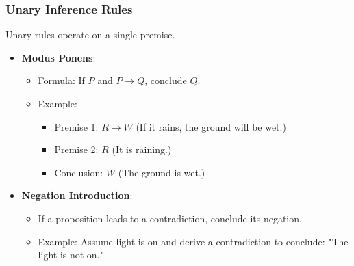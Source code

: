 \documentclass[aspectratio=169]{beamer}
\begin{document}
\begin{frame}[fragile]
    \frametitle{Unary Inference Rules}
    Unary rules operate on a single premise.
    \begin{itemize}
        \item \textbf{Modus Ponens}:
        \begin{itemize}
            \item Formula: If \(P\) and \(P \rightarrow Q\), conclude \(Q\).
            \item Example: 
                \begin{itemize}
                    \item Premise 1: \(R \rightarrow W\) (If it rains, the ground will be wet.)
                    \item Premise 2: \(R\) (It is raining.)
                    \item Conclusion: \(W\) (The ground is wet.)
                \end{itemize}
        \end{itemize}
        \item \textbf{Negation Introduction}:
        \begin{itemize}
            \item If a proposition leads to a contradiction, conclude its negation.
            \item Example: Assume light is on and derive a contradiction to conclude: "The light is not on."
        \end{itemize}
    \end{itemize}
\end{frame}
\end{document}
